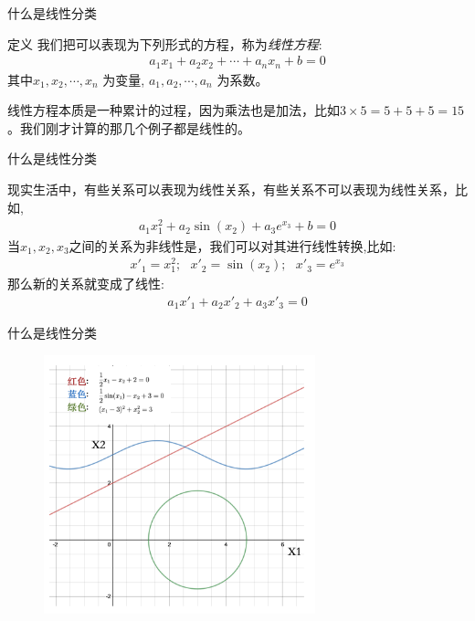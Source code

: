 \documentclass[handout]{ctexbeamer}
\begin{document}
\begin{frame}{什么是线性分类}
	\begin{block}{定义}
	我们把可以表现为下列形式的方程，称为\textit{线性方程}:
	\begin{align*}
		a_1 x_1 + a_2 x_2 + \cdots + a_n x_n + b = 0
	\end{align*}
	其中$x_1, x_2, \cdots, x_n$ 为变量, $a_1, a_2, \cdots, a_n$ 为系数。
\end{block}
线性方程本质是一种累计的过程，因为乘法也是加法，比如$3 \times 5 = 5 + 5 + 5 = 15$。我们刚才计算的那几个例子都是线性的。
\end{frame}

\begin{frame}{什么是线性分类}
	\begin{example}
现实生活中，有些关系可以表现为线性关系，有些关系不可以表现为线性关系，比如,
\begin{align*}
	a_1 x_1^2 + a_2 \sin (x_2) + a_3 e^{x_3} + b  = 0 
\end{align*}	
当$x_1, x_2, x_3$之间的关系为非线性是，我们可以对其进行线性转换,比如:
\begin{align*}
	x'_1 = x_1^2; \ \ \ x'_2 = \sin (x_2); \ \ \ x'_3 = e^{x_3}
\end{align*}
那么新的关系就变成了线性: 
\begin{align*}
	a_1 x'_1 + a_2 x'_2 + a_3 x'_3 = 0 
\end{align*}
\end{example}
\end{frame}

\begin{frame}{什么是线性分类}
\begin{figure}[H]
	\centering
	\includegraphics[width=0.7\textwidth]{fig/C2C2linear}
\end{figure}	
\end{frame}
\end{document}
